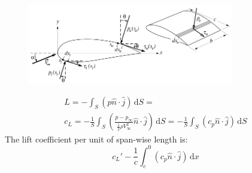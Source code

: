 \documentclass[class=report, crop=false, 12pt,a4paper]{standalone}
\begin{document}
\begin{figure}[H]
  \centering
  \includegraphics[width = 0.8\textwidth]{../img/diagram10.png}
\end{figure}
\begin{gather}
  L = - \int_{S}^{} \left(p\hat{n}\cdot \hat{j}\right)  \,\mathrm{d}S = \\
  c_L = - \frac{1}{S} \int_{S}^{} \left( \frac{p - p_{\infty}}{\frac{1}{2} \rho V_{\infty}^2} \hat{n} \cdot \hat{j} \right) \,\mathrm{d}S = -\frac{1}{S} \int_{S}^{} \left( c_p \hat{n} \cdot \hat{j} \right)  \,\mathrm{d}S  
\end{gather}
The lift coefficient per unit of span-wise length is:
\begin{equation}
  c_L' - \frac{1}{c}\int_{c}^{0} \left( c_p \hat{n}\cdot\hat{j} \right)  \,\mathrm{d}x 
\end{equation}
\end{document}
